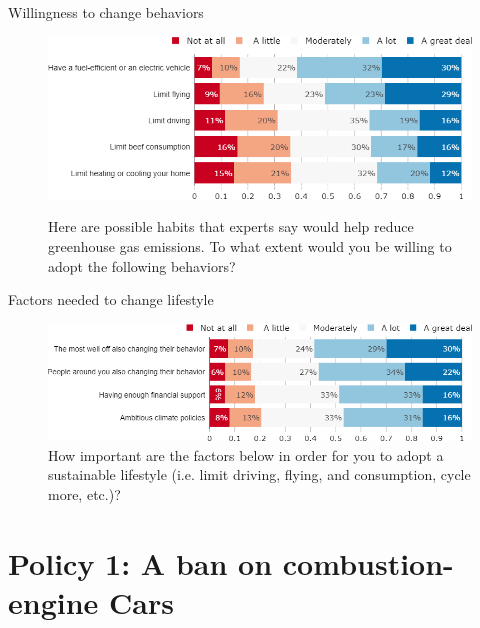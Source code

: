 \documentclass[aspectratio=169,9pt,dvipsnames]{beamer}
\begin{document}
\begin{frame}{Willingness to change behaviors}%
\begin{figure}[h!]
\centering
\caption{Here are possible habits that experts say would help reduce greenhouse gas emissions.
To what extent would you be willing to adopt the following behaviors?}
\includegraphics[width=.8\textwidth]{../figures/DK/willing_DK.png} \\
\end{figure}
\end{frame}

\begin{frame}{Factors needed to change lifestyle}%
\begin{figure}[h!]
\centering
\caption{How important are the factors below in order for you to adopt a sustainable lifestyle (i.e. limit driving, flying, and consumption, cycle more, etc.)?}
\includegraphics[width=1\textwidth]{../figures/DK/condition_DK.png}
\end{figure}
\end{frame}


\section{Policy 1: A ban on combustion-engine Cars}
\end{document}
